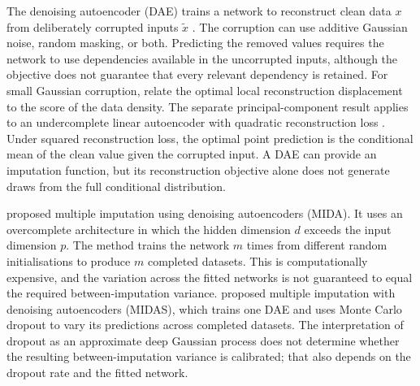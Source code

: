The denoising autoencoder (DAE) trains a network to reconstruct clean data $x$ from deliberately corrupted inputs $\tilde{x}$ \citep{vincent2008extracting}. The corruption can use additive Gaussian noise, random masking, or both. Predicting the removed values requires the network to use dependencies available in the uncorrupted inputs, although the objective does not guarantee that every relevant dependency is retained. For small Gaussian corruption, \citet{alain2014regularized} relate the optimal local reconstruction displacement to the score of the data density. The separate principal-component result applies to an undercomplete linear autoencoder with quadratic reconstruction loss \citep{baldi1989neural}. Under squared reconstruction loss, the optimal point prediction is the conditional mean of the clean value given the corrupted input. A DAE can provide an imputation function, but its reconstruction objective alone does not generate draws from the full conditional distribution.

\citet{gondara2018mida} proposed multiple imputation using denoising autoencoders (MIDA). It uses an overcomplete architecture in which the hidden dimension $d$ exceeds the input dimension $p$. The method trains the network $m$ times from different random initialisations to produce $m$ completed datasets. This is computationally expensive, and the variation across the fitted networks is not guaranteed to equal the required between-imputation variance. \citet{lall2022midas} proposed multiple imputation with denoising autoencoders (MIDAS), which trains one DAE and uses Monte Carlo dropout \citep{gal2016dropout} to vary its predictions across completed datasets. The interpretation of dropout as an approximate deep Gaussian process \citep{damianou2013deep,gal2016dropout} does not determine whether the resulting between-imputation variance is calibrated; that also depends on the dropout rate and the fitted network.

